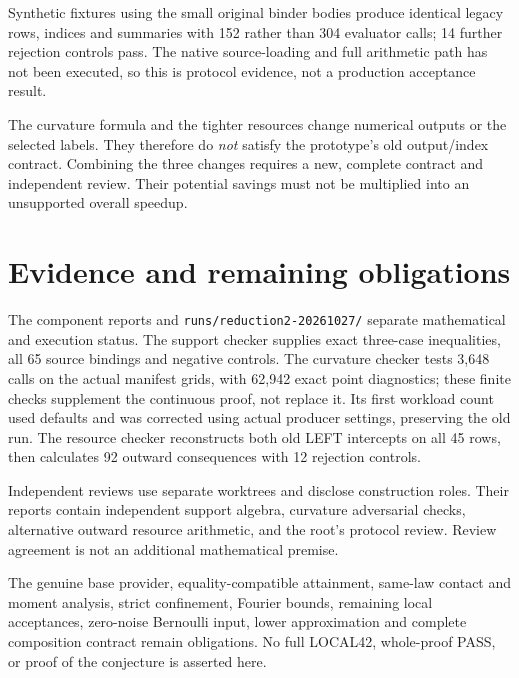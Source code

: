 \documentclass[11pt]{article}
\begin{document}
Synthetic fixtures using the small original binder bodies produce identical
legacy rows, indices and summaries with 152 rather than 304 evaluator calls;
14 further rejection controls pass. The native source-loading and full
arithmetic path has not been executed, so this is protocol evidence, not
a production acceptance result.

The curvature formula and the tighter resources change numerical outputs
or the selected labels. They therefore do \emph{not} satisfy the prototype's
old output/index contract. Combining the three changes requires a new,
complete contract and independent review. Their potential savings must not
be multiplied into an unsupported overall speedup.

\section{Evidence and remaining obligations}
The component reports and \texttt{runs/reduction2-20261027/} separate
mathematical and execution status. The support checker supplies exact
three-case inequalities, all 65 source bindings and negative controls.
The curvature checker tests 3,648 calls on the actual manifest grids,
with 62,942 exact point diagnostics; these finite checks supplement the
continuous proof, not replace it. Its first workload count used defaults
and was corrected using actual producer settings, preserving the old run.
The resource checker reconstructs both old LEFT intercepts on all 45 rows,
then calculates 92 outward consequences with 12 rejection controls.

Independent reviews use separate worktrees and disclose construction roles.
Their reports contain independent support algebra, curvature adversarial
checks, alternative outward resource arithmetic, and the root's protocol
review. Review agreement is not an additional mathematical premise.

The genuine base provider, equality-compatible attainment, same-law
contact and moment analysis, strict confinement, Fourier bounds, remaining
local acceptances, zero-noise Bernoulli input, lower approximation and
complete composition contract remain obligations. No full LOCAL42,
whole-proof PASS, or proof of the conjecture is asserted here.
\end{document}
